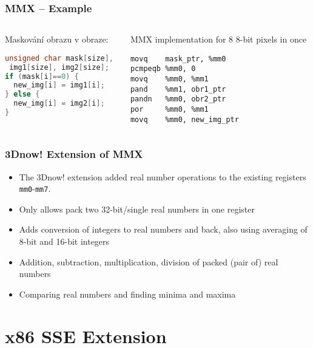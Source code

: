 \documentclass{beamer}
\begin{document}
\begin{frame}[fragile]
\frametitle{MMX -- Example}

\begin{columns}[t,onlytextwidth]
  \begin{column}{0.5\textwidth}
Maskování obrazu v obraze:
\begin{lstlisting}[language={C},columns=flexible]
unsigned char mask[size],
 img1[size], img2[size];
if (mask[i]==0) {
  new_img[i] = img1[i];
} else {
  new_img[i] = img2[i];
}
\end{lstlisting}

  \end{column}
  \begin{column}{0.5\textwidth}
MMX implementation for 8 8-bit pixels in once
\begin{lstlisting}[language={[x86masm]Assembler},columns=flexible]
movq    mask_ptr, %mm0
pcmpeqb %mm0, 0
movq    %mm0, %mm1
pand    %mm1, obr1_ptr
pandn   %mm0, obr2_ptr
por     %mm0, %mm1
movq    %mm0, new_img_ptr
\end{lstlisting}
  \end{column}
\end{columns}
\end{frame}




\begin{frame}
\frametitle{3Dnow! Extension of MMX}
\begin{itemize}
\item The 3Dnow! extension added real number operations to the existing registers \texttt{mm0}-\texttt{mm7}.
\item Only allows pack two 32-bit/single real numbers in one register
\item Adds conversion of integers to real numbers and back, also using averaging of 8-bit and 16-bit integers
\item Addition, subtraction, multiplication, division of packed (pair of) real numbers
\item Comparing real numbers and finding minima and maxima

\end{itemize}
\end{frame}

\section{x86 SSE Extension}
\end{document}
